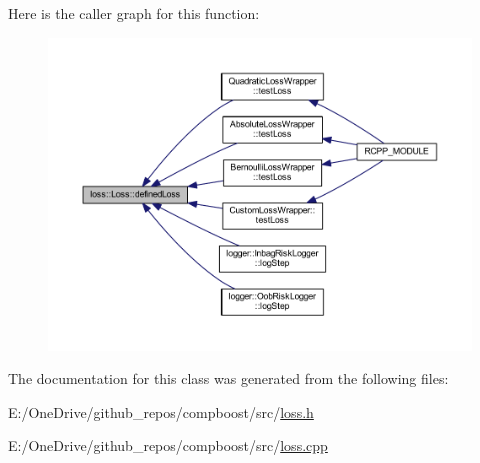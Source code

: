 Here is the caller graph for this function\+:\nopagebreak
\begin{figure}[H]
\begin{center}
\leavevmode
\includegraphics[width=350pt]{classloss_1_1_loss_ae9f94dd9b8311397583ba3a9cb485e94_icgraph}
\end{center}
\end{figure}


The documentation for this class was generated from the following files\+:\begin{DoxyCompactItemize}
\item 
E\+:/\+One\+Drive/github\+\_\+repos/compboost/src/\mbox{\hyperlink{loss_8h}{loss.\+h}}\item 
E\+:/\+One\+Drive/github\+\_\+repos/compboost/src/\mbox{\hyperlink{loss_8cpp}{loss.\+cpp}}\end{DoxyCompactItemize}
